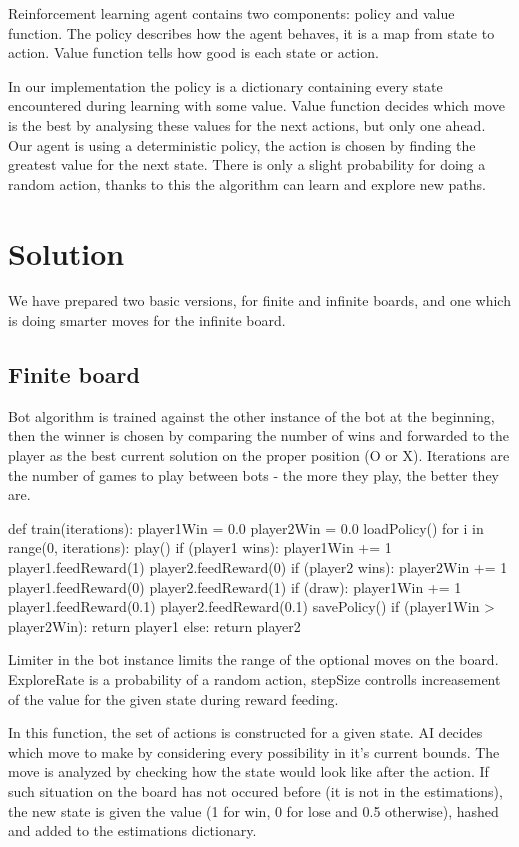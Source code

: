 \documentclass[a4paper,12pt]{book}
\begin{document}
Reinforcement learning agent contains two components: policy and value function. The policy describes how the agent behaves, it is a map from state to action. Value function tells how good is each state or action. 

In our implementation the policy is a dictionary containing every state encountered during learning with some value. Value function decides which move is the best by analysing these values for the next actions, but only one ahead. Our agent is using a deterministic policy, the action is chosen by finding the greatest value for the next state. There is only a slight probability for doing a random action, thanks to this the algorithm can learn and explore new paths.


	\chapter{Solution}

We have prepared two basic versions, for finite and infinite boards, and one which is doing smarter moves for the infinite board.

	\section{Finite board}
Bot algorithm is trained against the other instance of the bot at the beginning, then the winner is chosen by comparing the number of wins and forwarded to the player as the best current solution on the proper position (O or X). Iterations are the number of games to play between bots - the more they play, the better they are.
	
\begin{python}
def train(iterations):
	player1Win = 0.0
	player2Win = 0.0
	loadPolicy()
	for i in range(0, iterations):
		play()
		if (player1 wins):
			player1Win += 1
			player1.feedReward(1)
			player2.feedReward(0)
		if (player2 wins):
			player2Win += 1
			player1.feedReward(0)
			player2.feedReward(1)
		if (draw):
			player1Win += 1
			player1.feedReward(0.1)
			player2.feedReward(0.1)
	savePolicy()
	if (player1Win > player2Win):
		return player1
	else:
		return player2
\end{python}

Limiter in the bot instance limits the range of the optional moves on the board. ExploreRate is a probability of a random action, stepSize controlls increasement of the value for the given state during reward feeding. 

In this function, the set of actions is constructed for a given state. AI decides which move to make by considering every possibility in it's current bounds. The move is analyzed by checking how the state would look like after the action. If such situation on the board has not occured before (it is not in the estimations), the new state is given the value (1 for win, 0 for lose and 0.5 otherwise), hashed and added to the estimations dictionary.
\end{document}
